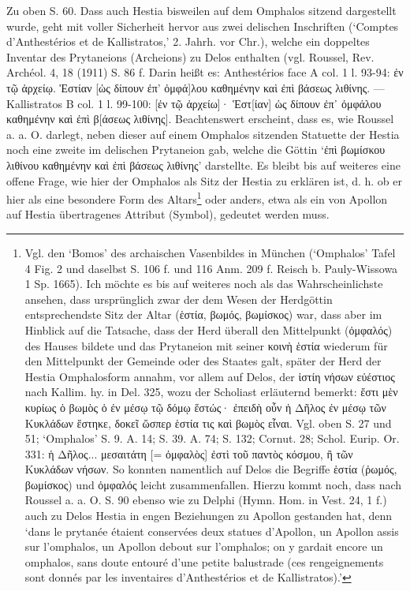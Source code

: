 \documentclass[a4paper, 11pt, oneside]{article}
\begin{document}
Zu oben S. 60. Dass auch Hestia bisweilen auf dem Omphalos sitzend dargestellt wurde, geht mit voller Sicherheit hervor aus zwei delischen Inschriften (`Comptes d'Anthestérios et de Kallistratos,' 2. Jahrh. vor Chr.), welche ein doppeltes Inventar des Prytaneions (Archeions) zu Delos enthalten (vgl. Roussel, Rev. Archéol. 4, 18 (1911) S. 86 f. Darin heißt es: Anthestérios face A col. 1 l. 93-94: ἐν τῷ ἀρχείῳ. Ἑστίαν [ὡς δίπουν ἐπ' ὀμφά]λου καθημένην καὶ ἐπὶ βάσεως λιθίνης. --- Kallistratos B col. 1 l. 99-100: [ἐν τῷ ἀρχείω]· Ἑστ[ίαν] ὡς δίπουν ἐπ᾽ ὀμφάλου καθημένην καὶ ἐπὶ β[άσεως λιθίνης]. Beachtenswert erscheint, dass es, wie Roussel a. a. O. darlegt, neben dieser auf einem Omphalos sitzenden Statuette der Hestia noch eine zweite im delischen Prytaneion gab, welche die Göttin `ἐπὶ βωμίσκου λιθίνου καθημένην καὶ ἐπὶ βάσεως λιθίνης' darstellte. Es bleibt bis auf weiteres eine offene Frage, wie hier der Omphalos als Sitz der Hestia zu erklären ist, d. h. ob er hier als eine besondere Form des Altars\footnote{Vgl. den `Bomos' des archaischen Vasenbildes in München (`Omphalos' Tafel 4 Fig. 2 und daselbst S. 106 f. und 116 Anm. 209 f. Reisch b. Pauly-Wissowa 1 Sp. 1665). Ich möchte es bis auf weiteres noch als das Wahrscheinlichste ansehen, dass ursprünglich zwar der dem Wesen der Herdgöttin entsprechendste Sitz der Altar (ἑστία, βωμός, βωμίσκος) war, dass aber im Hinblick auf die Tatsache, dass der Herd überall den Mittelpunkt (ὀμφαλός) des Hauses bildete und das Prytaneion mit seiner κοινὴ ἑστία wiederum für den Mittelpunkt der Gemeinde oder des Staates galt, später der Herd der Hestia Omphalosform annahm, vor allem auf Delos, der ἱστίη νήσων εὐέστιος nach Kallim. hy. in Del. 325, wozu der Scholiast erläuternd bemerkt: ἔστι μὲν κυρίως ὁ βωμὸς ὁ ἐν μέσῳ τῷ δόμῳ ἕστώς· ἐπειδὴ οὖν ἡ Δῆλος ἐν μέσῳ τῶν Κυκλάδων ἕστηκε, δοκεῖ ὥσπερ ἑστία τις καὶ βωμὸς εἶναι. Vgl. oben S. 27 und 51; `Omphalos' S. 9. A. 14; S. 39. A. 74; S. 132; Cornut. 28; Schol. Eurip. Or. 331: ἡ Δῆλος... μεσαιτάτη [= ὀμφαλὸς] ἐστὶ τοῦ παντὸς κόσμου, ἢ τῶν Κυκλάδων νήσων. So konnten namentlich auf Delos die Begriffe ἑστία (ῤωμός, βωμίσκος) und ὀμφαλός leicht zusammenfallen. Hierzu kommt noch, dass nach Roussel a. a. O. S. 90 ebenso wie zu Delphi (Hymn. Hom. in Vest. 24, 1 f.) auch zu Delos Hestia in engen Beziehungen zu Apollon gestanden hat, denn `dans le prytanée étaient conservées deux statues d'Apollon, un Apollon assis sur l'omphalos, un Apollon debout sur l'omphalos; on y gardait encore un omphalos, sans doute entouré d'une petite balustrade (ces rengeignements sont donnés par les inventaires d'Anthestérios et de Kallistratos).'} oder anders, etwa als ein von Apollon auf Hestia übertragenes Attribut (Symbol), gedeutet werden muss.
\end{document}
